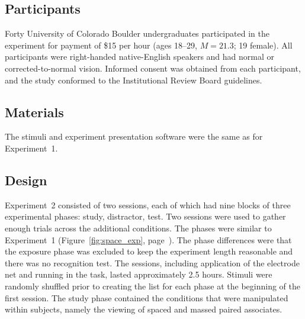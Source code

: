 \subsection{Participants}


Forty University of Colorado Boulder undergraduates participated in the experiment for payment of \$15 per hour (ages 18--29, $M=21.3$; 19 female).  All participants were right-handed native-English speakers and had normal or corrected-to-normal vision.  Informed consent was obtained from each participant, and the study conformed to the Institutional Review Board guidelines.

\subsection{Materials}

The stimuli and experiment presentation software were the same as for Experiment~1.

\subsection{Design}


Experiment~2 consisted of two sessions, each of which had nine blocks of three experimental phases: study, distractor, test.
Two sessions were used to gather enough trials across the additional conditions.
The phases were similar to Experiment~1 (Figure~\ref{fig:space_exp}, page~\pageref{fig:space_exp}).  The phase differences were that the exposure phase was excluded to keep the experiment length reasonable and there was no recognition test.
The sessions, including application of the electrode net and running in the task, lasted approximately 2.5 hours.  Stimuli were randomly shuffled prior to creating the list for each phase at the beginning of the first session.  The study phase contained the conditions that were manipulated within subjects, namely the viewing of spaced and massed paired associates.

